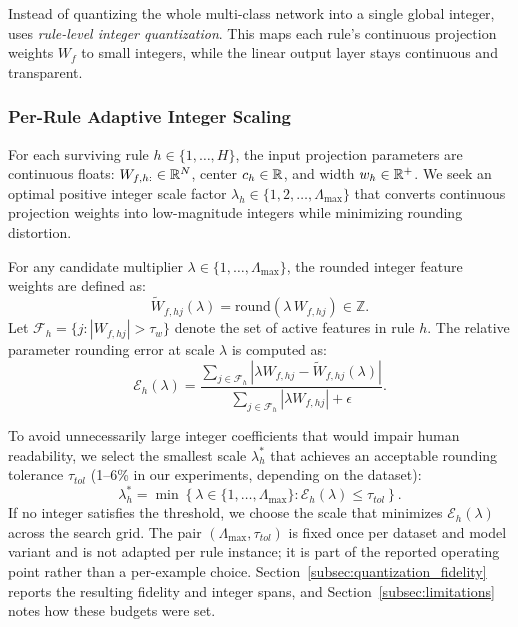 Instead of quantizing the whole multi-class network into a single global integer, \modelname{} uses \emph{rule-level integer quantization}. This maps each rule's continuous projection weights $W_f$ to small integers, while the linear output layer stays continuous and transparent.

\subsubsection{Per-Rule Adaptive Integer Scaling}
For each surviving rule $h \in \{1, \dots, H\}$, the input projection parameters are continuous floats: $W_{f,h:} \in \mathbb{R}^N$, center $c_h \in \mathbb{R}$, and width $w_h \in \mathbb{R}^+$. We seek an optimal positive integer scale factor $\lambda_h \in \{1, 2, \dots, \Lambda_{\max}\}$ that converts continuous projection weights into low-magnitude integers while minimizing rounding distortion.

For any candidate multiplier $\lambda \in \{1, \dots, \Lambda_{\max}\}$, the rounded integer feature weights are defined as:
\begin{equation}
\widetilde{W}_{f,hj}(\lambda) = \text{round}(\lambda \, W_{f,hj}) \in \mathbb{Z}.
\end{equation}
Let $\mathcal{F}_h = \{j : |W_{f,hj}| > \tau_w\}$ denote the set of active features in rule $h$. The relative parameter rounding error at scale $\lambda$ is computed as:
\begin{equation}
\mathcal{E}_h(\lambda) = \frac{\sum_{j \in \mathcal{F}_h} |\lambda W_{f,hj} - \widetilde{W}_{f,hj}(\lambda)|}{\sum_{j \in \mathcal{F}_h} |\lambda W_{f,hj}| + \epsilon}.
\end{equation}

To avoid unnecessarily large integer coefficients that would impair human readability, we select the smallest scale $\lambda_h^*$ that achieves an acceptable rounding tolerance $\tau_{tol}$ (1--6\% in our experiments, depending on the dataset):
\begin{equation}
\label{eq:adaptive_scale}
\lambda_h^* = \min \left\{ \lambda \in \{1, \dots, \Lambda_{\max}\} : \mathcal{E}_h(\lambda) \le \tau_{tol} \right\}.
\end{equation}
If no integer satisfies the threshold, we choose the scale that minimizes $\mathcal{E}_h(\lambda)$ across the search grid. The pair $(\Lambda_{\max}, \tau_{tol})$ is fixed once per dataset and model variant and is not adapted per rule instance; it is part of the reported operating point rather than a per-example choice. Section~\ref{subsec:quantization_fidelity} reports the resulting fidelity and integer spans, and Section~\ref{subsec:limitations} notes how these budgets were set.

